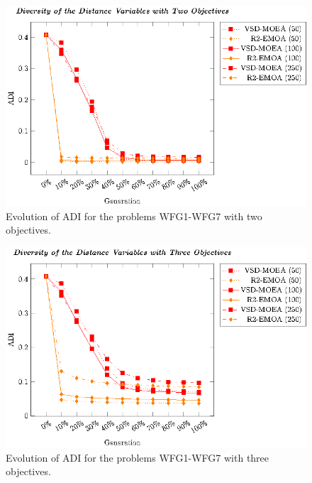 \begin{figure}[t]
\centering
%
\includegraphics[]{Images/Graphic-Diversity_2obj_tikz-figure1.eps}
\caption{Evolution of ADI for the problems WFG1-WFG7 with two objectives.}\label{fig:Diversity_2obj}
\end{figure}



%
%

\begin{figure}[t]
\centering
%
\includegraphics[]{Images/Graphic-Diversity_3obj_tikz-figure1.eps}
\caption{Evolution of ADI for the problems WFG1-WFG7 with three objectives.}\label{fig:Diversity_3obj}
\end{figure}
%

